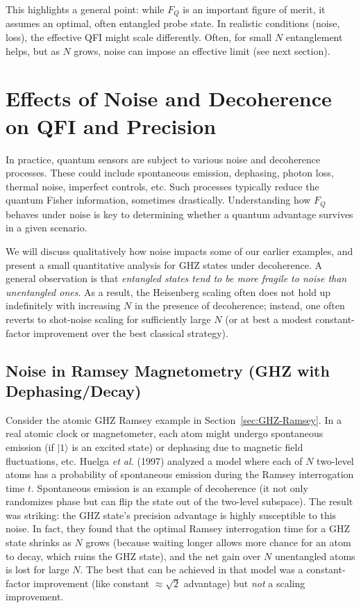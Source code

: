 This highlights a general point: while $F_Q$ is an important figure of
merit, it assumes an optimal, often entangled probe state. In
realistic conditions (noise, loss), the effective QFI might scale
differently. Often, for small $N$ entanglement helps, but as $N$
grows, noise can impose an effective limit (see next section).



\section{Effects of Noise and Decoherence on QFI and Precision}

\label{sec:noise}



In practice, quantum sensors are subject to various noise and
decoherence processes. These could include spontaneous emission,
dephasing, photon loss, thermal noise, imperfect controls, etc. Such
processes typically reduce the quantum Fisher information, sometimes
drastically. Understanding how $F_Q$ behaves under noise is key to
determining whether a quantum advantage survives in a given scenario.



We will discuss qualitatively how noise impacts some of our earlier
examples, and present a small quantitative analysis for GHZ states
under decoherence. A general observation is that \emph{entangled
states tend to be more fragile to noise than unentangled ones}. As a
result, the Heisenberg scaling often does not hold up indefinitely
with increasing $N$ in the presence of decoherence; instead, one often
reverts to shot-noise scaling for sufficiently large $N$ (or at best a
modest constant-factor improvement over the best classical strategy).



\subsection{Noise in Ramsey Magnetometry (GHZ with Dephasing/Decay)}



Consider the atomic GHZ Ramsey example in Section~\ref{sec:GHZ-Ramsey}. In a real atomic clock or magnetometer, each atom might undergo spontaneous emission (if $|1\rangle$ is an excited state) or dephasing due to magnetic field fluctuations, etc. Huelga \textit{et al.} (1997) \cite{Huelga1997} analyzed a model where each of $N$ two-level atoms has a probability of spontaneous emission during the Ramsey interrogation time $t$. Spontaneous emission is an example of decoherence (it not only randomizes phase but can flip the state out of the two-level subspace). The result was striking: the GHZ state’s precision advantage is highly susceptible to this noise. In fact, they found that the optimal Ramsey interrogation time for a GHZ state shrinks as $N$ grows (because waiting longer allows more chance for an atom to decay, which ruins the GHZ state), and the net gain over $N$ unentangled atoms is lost for large $N$. The best that can be achieved in that model was a constant-factor improvement (like  constant $\approx \sqrt{2}$ advantage) but \emph{not} a scaling improvement.



